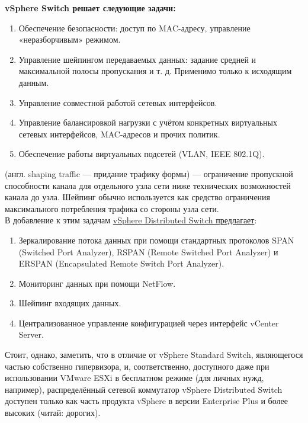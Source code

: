 \documentclass[14pt, a4paper]{article}
\begin{document}
\textbf{vSphere Switch решает следующие задачи:}
    \begin{enumerate}
        \item Обеспечение безопасности: доступ по MAC-адресу, управление «неразборчивым» режимом.
        \item Управление шейпингом передаваемых данных: задание средней и максимальной полосы
        пропускания и т. д. Применимо только к исходящим данным.
        \item Управление совместной работой сетевых интерфейсов.
        \item Управление балансировкой нагрузки с учётом конкретных виртуальных сетевых интерфейсов,
        MAC-адресов и прочих политик.
        \item Обеспечение работы виртуальных подсетей (VLAN, IEEE 802.1Q).
    \end{enumerate}

\href{https://ru.wikipedia.org/wiki/Шейпинг_(информатика)}{} (англ. shaping traffic — придание трафику формы) — ограничение пропускной способности
канала для отдельного узла сети ниже технических возможностей канала до узла. Шейпинг обычно
используется как средство ограничения максимального потребления трафика со стороны узла сети.\\

В добавление к этим задачам \href{https://kb.vmware.com/s/article/1010555}{vSphere Distributed Switch предлагает}:
\begin{enumerate}
    \item Зеркалирование потока данных при помощи стандартных протоколов SPAN (Switched Port
    Analyzer), RSPAN (Remote Switched Port Analyzer) и ERSPAN (Encapsulated Remote Switch Port
    Analyzer).
    \item Мониторинг данных при помощи NetFlow.
    \item Шейпинг входящих данных.
    \item Централизованное управление конфигурацией через интерфейс vCenter Server.
\end{enumerate}

Стоит, однако, заметить, что в отличие от vSphere Standard Switch, являющегося частью собственно
гипервизора, и, соответственно, доступного даже при использовании VMware ESXi в бесплатном
режиме (для личных нужд, например), распределённый сетевой коммутатор vSphere Distributed Switch
доступен только как часть продукта vSphere в версии Enterprise Plus и более высоких (читай: дорогих).
\end{document}
